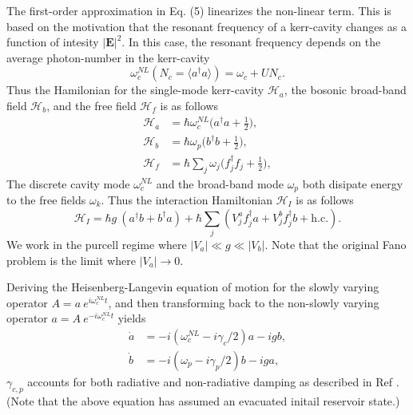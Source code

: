\documentclass[12pt]{article}
\begin{document}
The first-order approximation in Eq. (5) linearizes the non-linear term.
This is based on the motivation that the resonant frequency of a kerr-cavity
changes as a function of intesity $|\mathbf{E}|^2$. In this case, the resonant
frequency depends on the average photon-number in the kerr-cavity
\begin{equation}
\omega_c^{NL}( N_c = \langle a^{\dagger}a \rangle )  = \omega_c + UN_c.
\end{equation}
Thus the Hamilonian for the single-mode kerr-cavity $\mathcal{H}_a$, the 
bosonic broad-band field $\mathcal{H}_b$, and the free field $\mathcal{H}_f$
is as follows
\begin{align}
\mathcal{H}_a &= \hbar\omega_c^{NL}
    \Big( a^{\dagger}a + \frac{1}{2} \Big),
\\
\mathcal{H}_b &= \hbar\omega_p
    \Big( b^{\dagger}b + \frac{1}{2} \Big),
\\
\mathcal{H}_f &= \hbar \sum_j \omega_j
    \Big( f^{\dagger}_j f_j + \frac{1}{2} \Big),
\end{align}
The discrete cavity mode $\omega_c^{NL}$ and the broad-band mode $\omega_p$
both disipate energy to the free fields $\omega_k$. Thus the interaction
Hamiltonian $\mathcal{H}_{I}$ is as follows
\begin{equation}
\mathcal{H}_I = \hbar g \: (
    a^{\dagger}b + b^{\dagger}a )
    + \hbar \sum_j ( V_j^a f^{\dagger}_j a 
        + V_j^b f^{\dagger}_j b + \mathrm{h.c.} ).
\end{equation}
We work in the purcell regime where $|V_a| \ll g \ll |V_b|$. Note that the
original Fano problem is the limit where $|V_a| \rightarrow 0$.

Deriving the Heisenberg-Langevin equation of motion for the slowly varying
operator $A = a \: e^{i\omega_c^{NL} t}$, and then 
transforming back to the non-slowly varying operator $ a = 
A \: e^{-i\omega_c^{NL} t}$ yields
\begin{align}
\dot{ a } &= -i ( \omega_c^{NL} - i\gamma_c/2 ) a 
    - ig b,
\\
\dot{b} &= -i ( \omega_p - i\gamma_p/2 ) b
    - ig a,
\end{align}
$\gamma_{c,p}$ accounts for both radiative and non-radiative damping as
described in Ref \cite{thakkar2015quantum}. (Note that the above equation
has assumed an evacuated initail reservoir state.)
\end{document}

